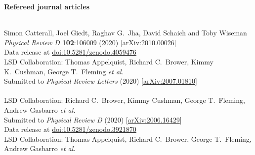 \begin{spacelist}
  \item {\large \bfseries Refereed journal articles}
  \begin{revnumerate}
    \setlength{\topsep}{-8 pt}
    \setlength{\itemsep}{10 pt}
    \setlength{\leftmargin}{0 mm}
    \pagebreakitem
       \\
      Simon Catterall, Joel Giedt, Raghav G.~Jha, David Schaich and Toby Wiseman \\
      \href{http://dx.doi.org/10.1103/PhysRevD.102.106009}{\textit{Physical Review D} \textbf{102}:106009} (2020) [\href{http://arxiv.org/abs/2010.00026}{arXiv:2010.00026}] \\
      Data release at \href{https://doi.org/10.5281/zenodo.4059476}{doi:10.5281/zenodo.4059476}
    \pagebreakitem
       \\
      LSD Collaboration: Thomas Appelquist, Richard C.~Brower, Kimmy K.~Cushman, George T.~Fleming \textit{et al.} \\ %
      Submitted to \textit{Physical Review Letters} (2020) [\href{http://arxiv.org/abs/2007.01810}{arXiv:2007.01810}] \\
    \pagebreakitem
       \\
      LSD Collaboration: Richard C.~Brower, Kimmy Cushman, George T.~Fleming, Andrew Gasbarro \textit{et al.} \\ %
      Submitted to \textit{Physical Review D} (2020) [\href{http://arxiv.org/abs/2006.16429}{arXiv:2006.16429}] \\
      Data release at \href{https://doi.org/10.5281/zenodo.3921870}{doi:10.5281/zenodo.3921870}
    \pagebreakitem
       \\
      LSD Collaboration: Thomas Appelquist, Richard C.~Brower, George T.~Fleming, Andrew Gasbarro \textit{et al.} \\ %

\end{revnumerate}
\end{spacelist}

